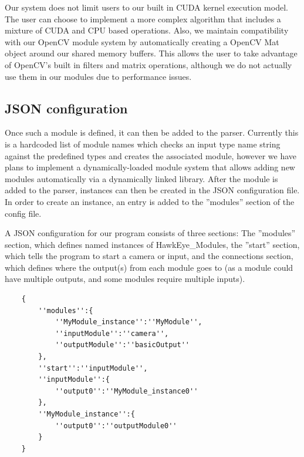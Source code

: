 \documentclass[letterpaper,10pt,titlepage]{IEEEtran}
\begin{document}
 \par
	Our system does not limit users to our built in CUDA kernel execution model. The user can choose to implement a more complex algorithm that includes a mixture of CUDA and CPU based operations. Also, we maintain compatibility with our OpenCV module system by automatically creating a OpenCV Mat object around our shared memory buffers. This allows the user to take advantage of OpenCV's built in filters and matrix operations, although we do not actually use them in our modules due to performance issues. \\

\subsection{JSON configuration}
	\par
Once such a module is defined, it can then be added to the parser. Currently this is a hardcoded list of module names which checks an input type name string against the predefined types and creates the associated module, however we have plans to implement a dynamically-loaded module system that allows adding new modules automatically via a dynamically linked library. After the module is added to the parser, instances can then be created in the JSON configuration file. In order to create an instance, an entry is added to the ''modules'' section of the config file.\\   
\par
A JSON configuration for our program consists of three sections: The ''modules'' section, which defines named instances of HawkEye\_Modules, the ''start'' section, which tells the program to start a camera or input, and the connections section, which defines where the output(s) from each module goes to (as a module could have multiple outputs, and some modules require multiple inputs).\\
   \begin{lstlisting}
   	{
		''modules'':{
			''MyModule_instance'':''MyModule'',
			''inputModule'':''camera'',
			''outputModule'':''basicOutput''
		},
		''start'':''inputModule'',
		''inputModule'':{
			''output0'':''MyModule_instance0''
		},
		''MyModule_instance'':{
			''output0'':''outputModule0''
		}
	}
   \end{lstlisting}
 \par 
\end{document}
